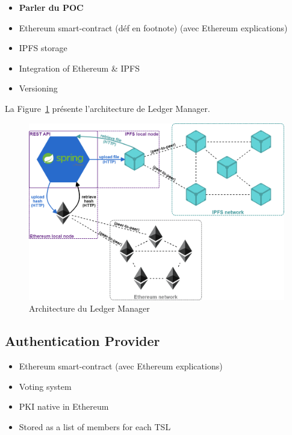 \documentclass{tnreport}
\begin{document}
\begin{itemize}
	\item \textbf{Parler du POC}
	\item Ethereum smart-contract (déf en footnote) (avec Ethereum explications) %
	\item IPFS storage
	\item Integration of Ethereum \& IPFS
	\item Versioning
\end{itemize}

La Figure~\ref{fig:ledger-architecture} présente l'architecture de Ledger Manager.

\begin{figure}[h]
	\centering
	\includegraphics[scale=0.45]{figures/poc}
	\caption{Architecture du Ledger Manager}
	\label{fig:ledger-architecture}
\end{figure}

\subsection{Authentication Provider}

\begin{itemize}
	\item Ethereum smart-contract (avec Ethereum explications)
	\item Voting system
	\item PKI native in Ethereum
	\item Stored as a list of members for each TSL
\end{itemize}
\end{document}
